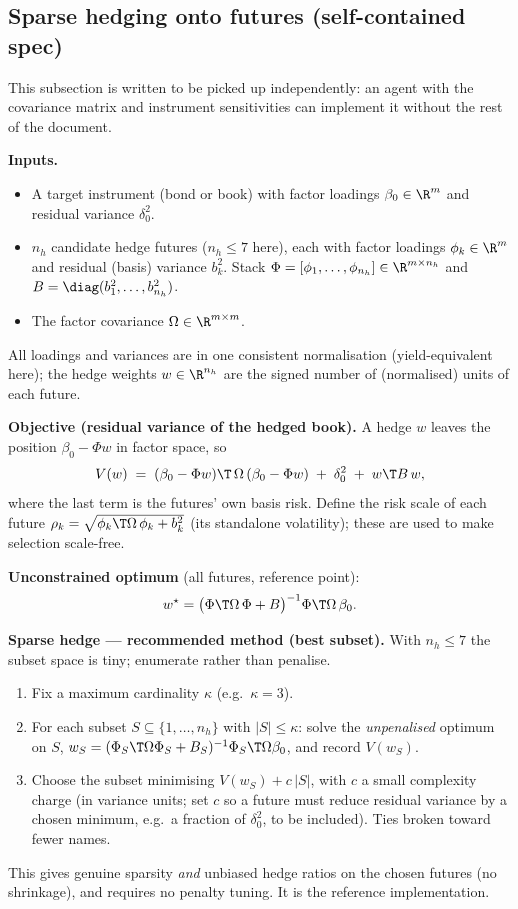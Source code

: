 \subsection{Sparse hedging onto futures (self-contained spec)}\label{sec:hedge}
This subsection is written to be picked up independently: an agent with the
covariance matrix and instrument sensitivities can implement it without the
rest of the document.
 
\smallskip\noindent\textbf{Inputs.}
\begin{itemize}
  \item A target instrument (bond or book) with factor loadings
        $\beta_0\in\R^m$ and residual variance $\delta_0^2$.
  \item $n_h$ candidate hedge futures ($n_h\le 7$ here), each with factor
        loadings $\phi_k\in\R^m$ and residual (basis) variance $b_k^2$. Stack
        $\Phi=[\phi_1,\dots,\phi_{n_h}]\in\R^{m\times n_h}$ and
        $B=\diag(b_1^2,\dots,b_{n_h}^2)$.
  \item The factor covariance $\Omega\in\R^{m\times m}$.
\end{itemize}
All loadings and variances are in one consistent normalisation (yield-equivalent
here); the hedge weights $w\in\R^{n_h}$ are the signed number of
(normalised) units of each future.
 
\smallskip\noindent\textbf{Objective (residual variance of the hedged book).}
A hedge $w$ leaves the position $\beta_0-\Phi w$ in factor space, so
\[
  V(w)\;=\;(\beta_0-\Phi w)\T\,\Omega\,(\beta_0-\Phi w)
  \;+\;\delta_0^2\;+\;w\T B\,w ,
\]
where the last term is the futures' own basis risk. Define the risk scale of
each future $\rho_k=\sqrt{\phi_k\T\Omega\,\phi_k+b_k^2}$ (its standalone
volatility); these are used to make selection scale-free.
 
\smallskip\noindent\textbf{Unconstrained optimum} (all futures, reference
point):
\[
  w^\star=\bigl(\Phi\T\Omega\,\Phi+B\bigr)^{-1}\Phi\T\Omega\,\beta_0 .
\]
 
\smallskip\noindent\textbf{Sparse hedge --- recommended method (best subset).}
With $n_h\le7$ the subset space is tiny; enumerate rather than penalise.
\begin{enumerate}
  \item Fix a maximum cardinality $\kappa$ (e.g.\ $\kappa=3$).
  \item For each subset $S\subseteq\{1,\dots,n_h\}$ with $|S|\le\kappa$: solve
        the \emph{unpenalised} optimum on $S$,
        $w_S=(\Phi_S\T\Omega\Phi_S+B_S)^{-1}\Phi_S\T\Omega\beta_0$, and record
        $V(w_S)$.
  \item Choose the subset minimising $V(w_S)+c\,|S|$, with $c$ a small
        complexity charge (in variance units; set $c$ so a future must reduce
        residual variance by a chosen minimum, e.g.\ a fraction of $\delta_0^2$,
        to be included). Ties broken toward fewer names.
\end{enumerate}
This gives genuine sparsity \emph{and} unbiased hedge ratios on the chosen
futures (no shrinkage), and requires no penalty tuning. It is the reference
implementation.
 
